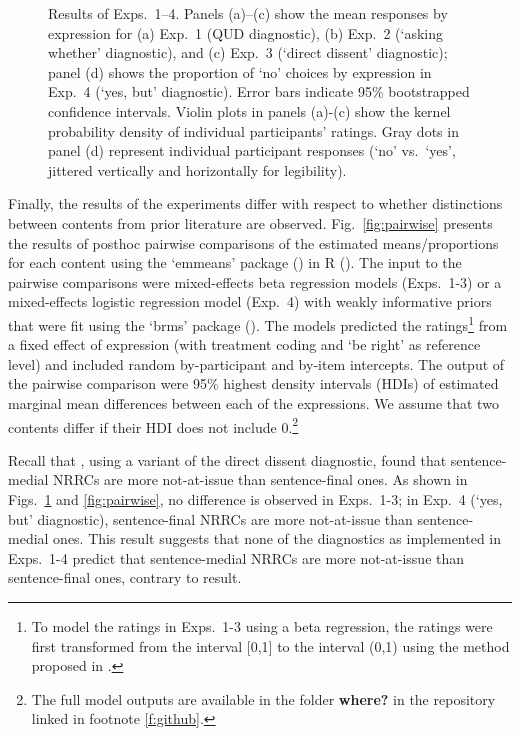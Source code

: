 \documentclass[times,linguex,xcolor]{glossa}
\begin{document}
\begin{figure}[h!]
    \caption{Results of Exps.~1--4. Panels (a)--(c) show the mean responses by expression for (a) Exp.~1 (QUD diagnostic),  (b) Exp.~2 (`asking whether' diagnostic), and (c) Exp.~3 (`direct dissent' diagnostic); panel (d) shows the proportion of `no' choices by expression in Exp.~4 (`yes, but' diagnostic). Error bars indicate 95\% bootstrapped confidence intervals. Violin plots in panels (a)-(c) show the kernel probability density of individual participants' ratings. Gray dots in panel (d) represent individual participant responses (`no' vs.\ `yes', jittered vertically and horizontally for legibility).}
    \label{fig:results}
  \end{figure}
  
Finally, the results of the experiments differ with respect to whether distinctions between contents from prior literature are observed. Fig.~\ref{fig:pairwise} presents the results of posthoc pairwise comparisons of the estimated means/proportions for each content using the `emmeans' package (\citealt{emmeans}) in R (\citealt{r}). The input to the pairwise comparisons were mixed-effects beta regression models (Exps.~1-3) or a mixed-effects logistic regression model (Exp.~4) with weakly informative priors that were fit using the `brms' package (\citealt{buerkner2017}). The models predicted the  ratings\footnote{To model the ratings in Exps.~1-3 using a beta regression, the ratings were first transformed from the interval [0,1] to the interval (0,1) using the method proposed in \citealt{smithson-verkuilen2006}.} from a fixed effect of expression (with treatment coding and `be right' as reference level) and included random by-participant and by-item intercepts. The output of the pairwise comparison were 95\% highest density intervals (HDIs) of estimated marginal mean differences between each of the expressions. We assume that two contents differ if their HDI does not include 0.\footnote{The full model outputs are available in the folder {\bf where?} in the repository linked in footnote \ref{f:github}.} 

Recall that \citealt{syrett_experimental_2015}, using a variant of the direct dissent diagnostic, found that sentence-medial NRRCs are more not-at-issue than sentence-final ones. As shown in Figs.~\ref{fig:results} and \ref{fig:pairwise}, no difference is observed in Exps.~1-3; in Exp.~4 (`yes, but' diagnostic), sentence-final NRRCs are more not-at-issue than sentence-medial ones.  This result suggests that none of the diagnostics as implemented in Exps.~1-4 predict that sentence-medial NRRCs are more not-at-issue than sentence-final ones, contrary to  result.
  
\end{document}
